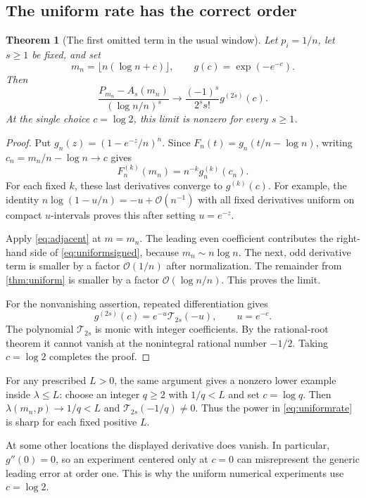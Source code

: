 \documentclass[11pt,a4paper]{article}
\newtheorem{theorem}{Theorem}[section]
\theoremstyle{definition}
\newcommand{\bigO}{\mathcal O}
\begin{document}
\subsection{The uniform rate has the correct order}

\begin{theorem}[The first omitted term in the usual window]\label{thm:uniformsharp}
Let $p_i=1/n$, let $s\ge1$ be fixed, and set
\[
 m_n=\lfloor n(\log n+c)\rfloor,\qquad
 g(c)=\exp(-e^{-c}).
\]
Then
\begin{equation}\label{eq:uniformsigned}
 \frac{P_{m_n}-A_s(m_n)}{(\log n/n)^s}
 \longrightarrow \frac{(-1)^s}{2^s s!}g^{(2s)}(c).
\end{equation}
At the single choice $c=\log2$, this limit is nonzero for every $s\ge1$.
\end{theorem}
\begin{proof}
Put $g_n(z)=(1-e^{-z}/n)^n$. Since
$F_n(t)=g_n(t/n-\log n)$, writing
$c_n=m_n/n-\log n\to c$ gives
\[
 F_n^{(k)}(m_n)=n^{-k}g_n^{(k)}(c_n).
\]
For each fixed $k$, these last derivatives converge to $g^{(k)}(c)$.
For example, the identity
$n\log(1-u/n)=-u+\bigO(n^{-1})$ with all fixed derivatives
uniform on compact $u$-intervals proves this after setting $u=e^{-z}$.

Apply \eqref{eq:adjacent} at $m=m_n$. The leading even coefficient
contributes the right-hand side of \eqref{eq:uniformsigned}, because
$m_n\sim n\log n$. The next, odd derivative term is smaller by a
factor $\bigO(1/n)$ after normalization. The remainder from
\cref{thm:uniform} is smaller by a factor $\bigO(\log n/n)$.
This proves the limit.

For the nonvanishing assertion, repeated differentiation gives
\[
 g^{(2s)}(c)=e^{-u}\mathcal T_{2s}(-u),\qquad u=e^{-c}.
\]
The polynomial $\mathcal T_{2s}$ is monic with integer coefficients.
By the rational-root theorem it cannot vanish at the nonintegral rational
number $-1/2$. Taking $c=\log2$ completes the proof.
\end{proof}

For any prescribed $L>0$, the same argument gives a nonzero lower
example inside $\lambda\le L$: choose an integer $q\ge2$ with
$1/q<L$ and set $c=\log q$. Then $\lambda(m_n,p)\to1/q<L$ and
$\mathcal T_{2s}(-1/q)\ne0$. Thus the power in
\eqref{eq:uniformrate} is sharp for each fixed positive $L$.

At some other locations the displayed derivative does vanish. In
particular, $g''(0)=0$, so an experiment centered only at $c=0$ can
misrepresent the generic leading error at order one. This is why the
uniform numerical experiments use $c=\log2$.
\end{document}
